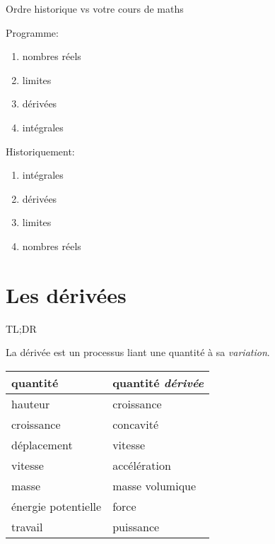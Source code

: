 \documentclass{beamer}
\begin{document}
\begin{frame}
    {Ordre historique vs votre cours de maths}

    Programme:
    \begin{enumerate}
        \item nombres réels
        \item limites
        \item dérivées
        \item intégrales
    \end{enumerate}
    \pause{}

    Historiquement:
    \begin{enumerate}
        \item intégrales
            \pause{}
        \item dérivées
            \pause{}
        \item limites
            \pause{}
        \item nombres réels
    \end{enumerate}
\end{frame}

\section{Les dérivées}

\begin{frame}
    {TL;DR}

    La dérivée est un processus liant une quantité à sa \emph{variation}.
    \pause{}

    \begin{center}
        \begin{tabular}
            {|l|l|}

            \toprule
            quantité & quantité \emph{dérivée}\\
            \midrule

            hauteur & croissance\\
            croissance & concavité\\
            déplacement & vitesse\\
            vitesse & accélération\\
            masse & masse volumique\\
            énergie potentielle & force\\
            travail & puissance\\
            \bottomrule
        \end{tabular}
    \end{center}
\end{frame}
\end{document}
